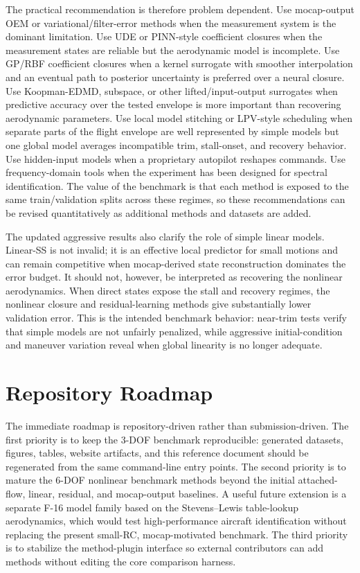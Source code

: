 \documentclass[11pt]{article}
\begin{document}
The practical recommendation is therefore problem dependent. Use mocap-output
OEM or variational/filter-error methods when the measurement system is the
dominant limitation. Use UDE or PINN-style coefficient closures when the
measurement states are reliable but the aerodynamic model is incomplete. Use
GP/RBF coefficient closures when a kernel surrogate with smoother interpolation
and an eventual path to posterior uncertainty is preferred over a neural
closure. Use Koopman-EDMD, subspace, or other lifted/input-output surrogates
when predictive accuracy over the tested envelope is more important than
recovering aerodynamic parameters. Use local model stitching or LPV-style
scheduling when separate parts of the flight envelope are well represented by
simple models but one global model averages incompatible trim, stall-onset, and
recovery behavior. Use
hidden-input models when a proprietary autopilot reshapes commands. Use
frequency-domain tools when the experiment has been designed for spectral
identification. The value of the benchmark is that each method is exposed to
the same train/validation splits across these regimes, so these recommendations
can be revised quantitatively as additional methods and datasets are added.

The updated aggressive results also clarify the role of simple linear models.
Linear-SS is not invalid; it is an effective local predictor for small motions
and can remain competitive when mocap-derived state reconstruction dominates
the error budget. It should not, however, be interpreted as recovering the
nonlinear aerodynamics. When direct states expose the stall and recovery
regimes, the nonlinear closure and residual-learning methods give substantially
lower validation error. This is the intended benchmark behavior: near-trim tests
verify that simple models are not unfairly penalized, while aggressive
initial-condition and maneuver variation reveal when global linearity is no
longer adequate.

\section{Repository Roadmap}
The immediate roadmap is repository-driven rather than submission-driven. The first priority is to keep the 3-DOF benchmark reproducible: generated datasets, figures, tables, website artifacts, and this reference document should be regenerated from the same command-line entry points. The second priority is to mature the 6-DOF nonlinear benchmark methods beyond the initial attached-flow, linear, residual, and mocap-output baselines. A useful future extension is a separate F-16 model family based on the Stevens--Lewis table-lookup aerodynamics, which would test high-performance aircraft identification without replacing the present small-RC, mocap-motivated benchmark. The third priority is to stabilize the method-plugin interface so external contributors can add methods without editing the core comparison harness.
\end{document}
